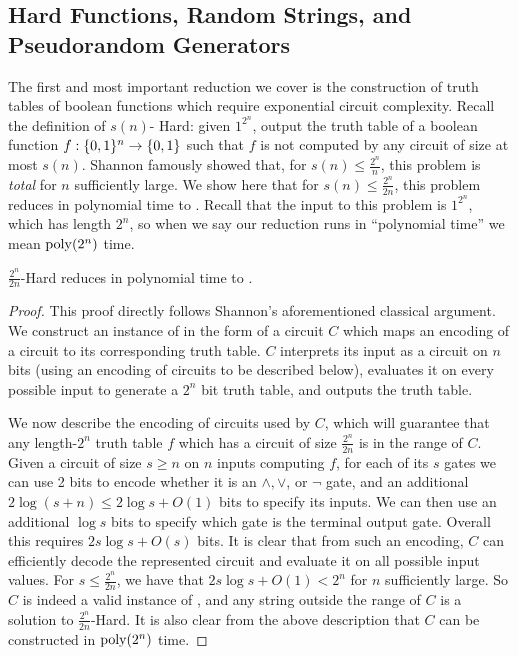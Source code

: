 \subsection{Hard Functions, Random Strings, and Pseudorandom Generators}\label{range:subsec:hard-functions-random-strings-prgs}
The first and most important reduction we cover is the construction of truth tables of boolean functions which require exponential circuit complexity. Recall the definition of {\sc $s(n)$- Hard}:  given $1^{2^n}$, output the truth table of a boolean function $f: \{0,1\}^n \to \{0,1\}$ such that $f$ is not computed by any circuit of size at most $s(n)$. Shannon famously showed that, for $s(n) \leq \frac{2^n}{n}$, this problem is \emph{total} for $n$ sufficiently large. We show here that for $s(n) \leq \frac{2^n}{2n}$, this problem reduces in polynomial time to \avoid. Recall that the input to this problem is $1^{2^n}$, which has length $2^n$, so when we say our reduction runs in ``polynomial time'' we mean $\mathrm{poly}(2^n)$ time.

\begin{theorem}\label{thm:truth-tables-in-apepp}
{\sc $\frac{2^n}{2n}$-Hard} reduces in polynomial time to \avoid.
\end{theorem}
\begin{proof}
This proof directly follows Shannon's aforementioned classical argument. We construct an instance of \avoid in the form of a circuit $C$ which maps an encoding of a circuit to its corresponding truth table. $C$ interprets its input as a circuit on $n$ bits (using an encoding of circuits to be described below), evaluates it on every possible input to generate a $2^{n}$ bit truth table, and outputs the truth table.

We now describe the encoding of circuits used by $C$, which will guarantee that any length-$2^n$ truth table $f$ which has a circuit of size $\frac{2^n}{2n}$ is in the range of $C$. Given a circuit of size $s \geq n $ on $n$ inputs computing $f$, for each of its $s$ gates we can use 2 bits to encode whether it is an $\land, \lor$, or $\lnot$ gate, and an additional $2\log (s+n) \leq 2\log s + O(1)$ bits to specify its inputs. We can then use an additional $\log s$ bits to specify which gate is the terminal output gate. Overall this requires $2s\log s + O(s)$ bits. It is clear that from such an encoding, $C$ can efficiently decode the represented circuit and evaluate it on all possible input values. For $s \leq \frac{2^n}{2n}$, we have that $2 s \log s + O(1) < 2^n$ for $n$ sufficiently large. So $C$ is indeed a valid instance of \avoid, and any string outside the range of $C$ is a solution to {\sc $\frac{2^n}{2n}$-Hard}. It is also clear from the above description that $C$ can be constructed in $\mathrm{poly}(2^n)$ time.

\end{proof}


